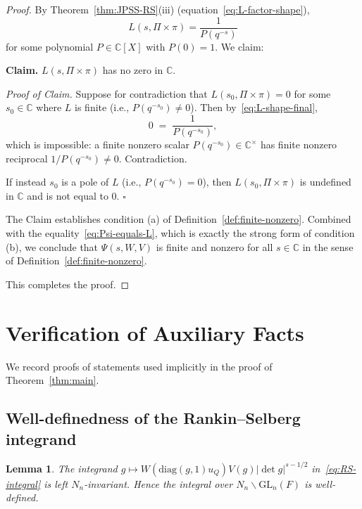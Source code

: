 \documentclass[12pt]{article}
\newtheorem{lemma}[theorem]{Lemma}
\theoremstyle{definition}
\begin{document}
\begin{proof}
By Theorem~\ref{thm:JPSS-RS}(iii) (equation~\eqref{eq:L-factor-shape}),
\begin{equation}\label{eq:L-shape-final}
L(s,\Pi\times\pi)=\frac{1}{P(q^{-s})}
\end{equation}
for some polynomial $P\in\mathbb{C}[X]$ with $P(0)=1$. We claim:

\medskip

\noindent\textbf{Claim.} $L(s,\Pi\times\pi)$ has no zero in $\mathbb{C}$.

\medskip

\noindent\emph{Proof of Claim.} Suppose for contradiction that $L(s_0,\Pi\times\pi)=0$ for some $s_0\in\mathbb{C}$ where $L$ is finite (i.e., $P(q^{-s_0})\ne 0$). Then by~\eqref{eq:L-shape-final},
$$0\;=\;\frac{1}{P(q^{-s_0})},$$
which is impossible: a finite nonzero scalar $P(q^{-s_0})\in\mathbb{C}^\times$ has finite nonzero reciprocal $1/P(q^{-s_0})\ne 0$. Contradiction.

If instead $s_0$ is a pole of $L$ (i.e., $P(q^{-s_0})=0$), then $L(s_0,\Pi\times\pi)$ is undefined in $\mathbb{C}$ and is not equal to $0$. \hfill$\square$

\medskip

The Claim establishes condition (a) of Definition~\ref{def:finite-nonzero}. Combined with the equality~\eqref{eq:Psi-equals-L}, which is exactly the strong form of condition (b), we conclude that $\Psi(s,W,V)$ is finite and nonzero for all $s\in\mathbb{C}$ in the sense of Definition~\ref{def:finite-nonzero}.

This completes the proof.
\end{proof}

\section{Verification of Auxiliary Facts}

We record proofs of statements used implicitly in the proof of Theorem~\ref{thm:main}.

\subsection{Well-definedness of the Rankin--Selberg integrand}

\begin{lemma}\label{lem:Psi-well-defined}
The integrand $g\mapsto W(\mathrm{diag}(g,1)u_Q)V(g)|\det g|^{s-1/2}$ in~\eqref{eq:RS-integral} is left $N_n$-invariant. Hence the integral over $N_n\backslash\mathrm{GL}_n(F)$ is well-defined.
\end{lemma}
\end{document}
